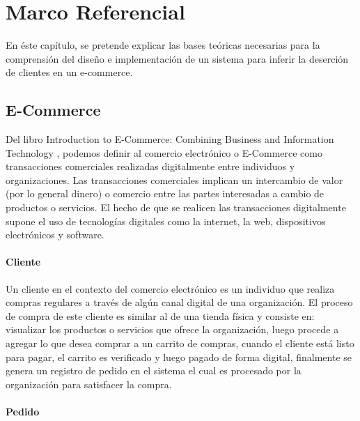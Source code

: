 
\chapter{Marco Referencial}

En éste capítulo, se pretende explicar las bases teóricas necesarias para la comprensión del diseño e implementación de un sistema para inferir la deserción de clientes en un e-commerce.

\section{E-Commerce}

Del libro Introduction to E-Commerce: Combining Business and Information Technology \cite{kutz2016}, podemos definir al comercio electrónico o E-Commerce como transacciones comerciales realizadas digitalmente entre individuos y organizaciones. Las transacciones comerciales implican un intercambio de valor (por lo general dinero) o comercio entre las partes interesadas a cambio de productos o servicios. El hecho de que se realicen las transacciones digitalmente supone el uso de tecnologías digitales como la internet, la web, dispositivos electrónicos y software.

\subsubsection{Cliente}

Un cliente en el contexto del comercio electrónico es un individuo que realiza compras regulares a través de algún canal digital de una organización. El proceso de compra de este cliente es similar al de una tienda física y consiste en: visualizar los productos o servicios que ofrece la organización, luego procede a agregar lo que desea comprar a un carrito de compras, cuando el cliente está listo para pagar, el carrito es verificado y luego pagado de forma digital, finalmente se genera un registro de pedido en el sistema el cual es procesado por la organización para satisfacer la compra.

\subsubsection{Pedido}

